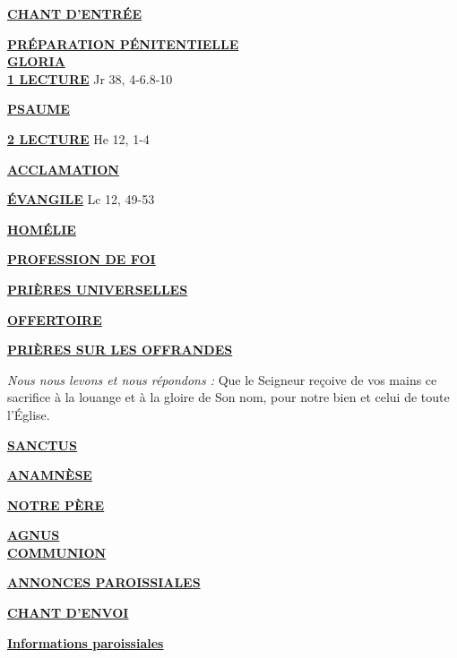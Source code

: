 \documentclass[french,11pt]{article}
\newcommand*{\chants}{../chants}
\newcommand*{\messe}{../messe_david_julien}
\newcommand*{\pu}{../pu}
\newcommand*{\psaumes}{../psaumes}
\newcommand{\NewsItem}[1]{%
\vspace{3pt}
\underline{\textbf{#1}}
		  }
\begin{document}
\NewsItem{CHANT D'ENTRÉE}
	

\NewsItem{PRÉPARATION PÉNITENTIELLE} \\
	

\NewsItem{GLORIA}\\
	


\NewsItem{1\iere{} LECTURE} Jr 38, 4-6.8-10

\NewsItem{PSAUME}


\NewsItem{2\ieme{} LECTURE} He 12, 1-4

\NewsItem{ACCLAMATION}


\NewsItem{ÉVANGILE} Lc 12, 49-53

\NewsItem{HOMÉLIE}

\NewsItem{PROFESSION DE FOI}
%


\NewsItem{PRIÈRES UNIVERSELLES}


\NewsItem{OFFERTOIRE}

\NewsItem{PRIÈRES SUR LES OFFRANDES}
\textit{Nous nous levons et nous répondons : }
Que le Seigneur reçoive de vos mains ce sacrifice à la louange et à la gloire
de Son nom, pour notre bien et celui de toute l’Église.

\NewsItem{SANCTUS}


\NewsItem{ANAMNÈSE}


\NewsItem{NOTRE PÈRE}

\NewsItem{AGNUS} \\


\NewsItem{COMMUNION}


\NewsItem{ANNONCES PAROISSIALES}


\NewsItem{CHANT D'ENVOI}


\newpage



\NewsItem{Informations paroissiales}
\end{document}
